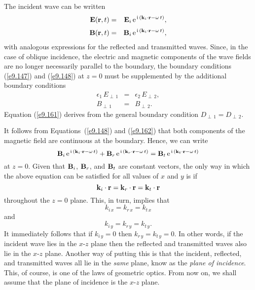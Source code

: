 The incident wave can be written
\begin{eqnarray}
{\bf E}({\bf r},t) &=& {\bf E}_i\,{\rm e}^{\,{\rm i}\,({\bf k}_i\cdot{\bf r}-\omega\,t)},\\[0.5ex]
{\bf B}({\bf r},t) &=& {\bf B}_i\,{\rm e}^{\,{\rm i}\,({\bf k}_i\cdot{\bf r}-\omega\,t)},
\end{eqnarray}
with analogous expressions for the reflected and transmitted waves.
Since, in the case of oblique incidence, the electric and magnetic
components of the wave fields are no longer necessarily parallel to the
boundary, the boundary conditions (\ref{e9.147}) and (\ref{e9.148}) at $z=0$ must
be supplemented by the additional boundary conditions
\begin{eqnarray}\label{e9.161}
\epsilon_1\,E_{\perp\,1} &=& \epsilon_2\,E_{\perp\,2},\\[0.5ex]
B_{\perp\,1} &=& B_{\perp\,2}.\label{e9.162}
\end{eqnarray}
Equation (\ref{e9.161}) derives from the general
boundary condition $D_{\perp\,1} = D_{\perp\,2}$.

It follows from Equations~(\ref{e9.148}) and (\ref{e9.162}) that both components
of the magnetic field are continuous at the boundary. Hence, we can write
\begin{equation}
 {\bf B}_i\,{\rm e}^{\,{\rm i}\,({\bf k}_i\cdot{\bf r}-\omega\,t)}
 + {\bf B}_r\,{\rm e}^{\,{\rm i}\,({\bf k}_r\cdot{\bf r}-\omega\,t)}= {\bf B}_t\,{\rm e}^{\,{\rm i}\,({\bf k}_t\cdot{\bf r}-\omega\,t)}
\end{equation}
at $z=0$. Given that ${\bf B}_i$, ${\bf B}_r$, and ${\bf B}_t$ are
constant vectors, the only way in which the above equation can be satisfied for all
values of $x$ and $y$ is if
\begin{equation}
{\bf k}_i\cdot{\bf r} = {\bf k}_r\cdot{\bf r} = {\bf k}_t\cdot{\bf r} 
\end{equation}
throughout the $z=0$ plane. This, in turn, implies that
\begin{equation}\label{e9.165}
k_{i\,x} =k_{r\,x}= k_{t\,x}
\end{equation}
and
\begin{equation}
k_{i\,y} = k_{r\,y} = k_{t\,y}.
\end{equation}
It immediately follows that if $k_{i\,y}=0$ then $k_{r\,y} =k_{t\,y}=0$.
In other words, if the incident wave lies in the $x$-$z$ plane then the
reflected and transmitted waves also lie in the $x$-$z$ plane. Another
way of putting this is that the incident, reflected, and transmitted
waves all lie in the {\em same} plane, know as the {\em plane
of incidence}. This, of course, is one of the laws of geometric optics.
From now on, we shall assume that the plane of incidence is the $x$-$z$
plane.

